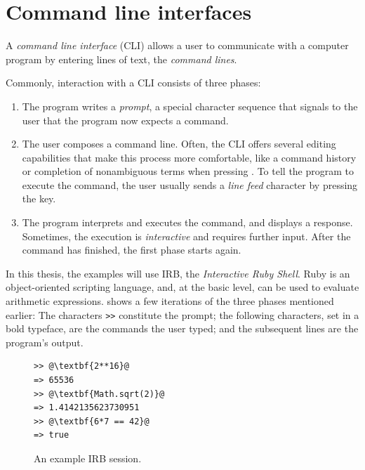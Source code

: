 \documentclass[paper=a4,twoside,abstract=on,cleardoublepage=empty,numbers=noenddot,toc=bib,toc=listof,12pt,appendixprefix=true]{scrreprt}
\begin{document}
\section{Command line interfaces}
\label{sec:cli}

A \emph{command line interface} (\textsc{CLI}) allows a user to communicate with a computer program by entering lines of text, the \emph{command lines}.

Commonly, interaction with a \textsc{CLI} consists of three phases:

\begin{enumerate}
    \item The program writes a \emph{prompt}, a special character sequence that signals to the user that the program now expects a command.
    \item The user composes a command line. Often, the CLI offers several editing capabilities that make this process more comfortable, like a command history or completion of nonambiguous terms when pressing . To tell the program to execute the command, the user usually sends a \emph{line feed} character by pressing the  key.
    \item The program interprets and executes the command, and displays a response. Sometimes, the execution is \emph{interactive} and requires further input. After the command has finished, the first phase starts again.
\end{enumerate}

In this thesis, the examples will use IRB, the \emph{Interactive Ruby Shell}. Ruby is an object-oriented scripting language, and, at the basic level, can be used to evaluate arithmetic expressions.  shows a few iterations of the three phases mentioned earlier: The characters \texttt{>\->} constitute the prompt; the following characters, set in a bold typeface, are the commands the user typed; and the subsequent lines are the program's output.

\begin{figure}[tb]
    \begin{lstlisting}[escapechar=@,frame=shadowbox]
>> @\textbf{2**16}@
=> 65536
>> @\textbf{Math.sqrt(2)}@
=> 1.4142135623730951
>> @\textbf{6*7 == 42}@
=> true
    \end{lstlisting}
    \centering
    \caption{An example IRB session.}
    \label{fig:irb}
\end{figure}
\end{document}

